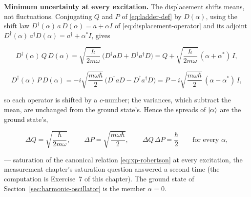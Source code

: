 \textbf{Minimum uncertainty at every excitation.} The displacement shifts means, not fluctuations. Conjugating $Q$ and $P$ of \eqref{eq:ladder-def} by $D(\alpha)$, using the shift law $D^\dagger(\alpha)\,a\,D(\alpha)=a+\alpha I$ of \eqref{eq:displacement-operator} and its adjoint $D^\dagger(\alpha)\,a^\dagger D(\alpha)=a^\dagger+\alpha^{*}I$, gives
\begin{linenomath}
    \begin{equation*}
        D^\dagger(\alpha)\,Q\,D(\alpha)
        = \sqrt{\frac{\hbar}{2m\omega}}\,\bigl(D^\dagger a D + D^\dagger a^\dagger D\bigr)
        = Q + \sqrt{\frac{\hbar}{2m\omega}}\,(\alpha+\alpha^{*})\,I,
    \end{equation*}
\end{linenomath}
\begin{linenomath}
    \begin{equation*}
        D^\dagger(\alpha)\,P\,D(\alpha)
        = -i\sqrt{\frac{m\omega\hbar}{2}}\,\bigl(D^\dagger a D - D^\dagger a^\dagger D\bigr)
        = P - i\sqrt{\frac{m\omega\hbar}{2}}\,(\alpha-\alpha^{*})\,I,
    \end{equation*}
\end{linenomath}
so each operator is shifted by a $c$-number; the variances, which subtract the mean, are unchanged from the ground state's. Hence the spreads of $\ket{\alpha}$ are the ground state's,
\begin{linenomath}
    \begin{equation}
        \Delta Q = \sqrt{\frac{\hbar}{2m\omega}},
        \qquad
        \Delta P = \sqrt{\frac{m\omega\hbar}{2}},
        \qquad
        \Delta Q\,\Delta P = \frac{\hbar}{2}
        \qquad\text{for every }\alpha,
    \end{equation}
\end{linenomath}
--- saturation of the canonical relation \eqref{eq:xp-robertson} at every excitation, the measurement chapter's saturation question answered a second time (the computation is Exercise~7 of this chapter). The ground state of Section~\ref{sec:harmonic-oscillator} is the member $\alpha = 0$.

